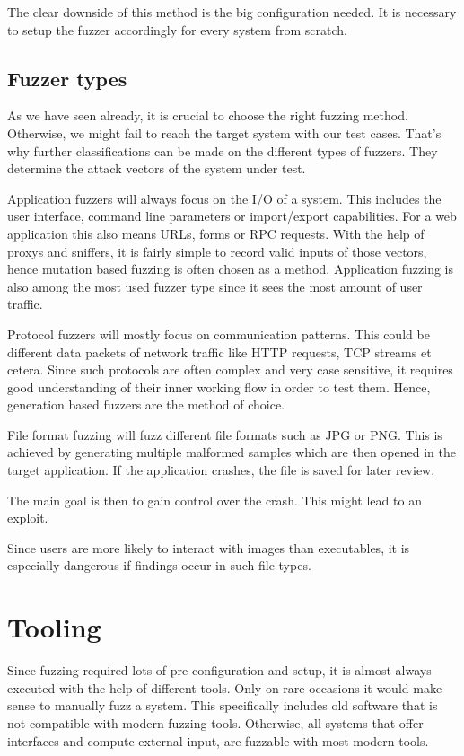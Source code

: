 \documentclass[journal=tosc,final]{iacrtrans}
\begin{document}
   The clear downside of this method is the big configuration needed. It is necessary to setup the fuzzer accordingly for every system from scratch. 
\subsection{Fuzzer types}
As we have seen already, it is crucial to choose the right fuzzing method. Otherwise, we might fail to reach the target system with our test cases. That's  why further classifications can be made on the different types of fuzzers. They determine the attack vectors of the system under test. 

Application fuzzers will always focus on the I/O of a system. This includes the user interface, command line parameters or import/export capabilities. For a web application this also means URLs, forms or RPC requests. With the help of proxys and sniffers, it is fairly simple to record valid inputs of those vectors, hence mutation based fuzzing is often chosen as a method. Application fuzzing  is also among the most used fuzzer type since it sees the most amount of user traffic.

Protocol fuzzers will mostly focus on communication patterns. This could be different data packets of network traffic like HTTP requests, TCP streams et cetera. Since such protocols are often complex and very case sensitive, it requires good understanding of their inner working flow in order to test them. Hence, generation based fuzzers are the method of choice.

File format fuzzing will fuzz different file formats such as JPG or PNG. This is achieved by generating multiple malformed samples which are then opened in the target application. 
If the application crashes, the file is saved for later review. 

The main goal is then to gain control over the crash. This might lead to an exploit.

Since users are more likely to interact with images than executables, it is especially dangerous if findings occur in such file types.
\section{Tooling}
Since fuzzing required lots of pre configuration and setup, it is almost always executed with the help of different tools. Only on rare occasions it would make sense to manually fuzz a system. This specifically includes old software that is not compatible with modern fuzzing tools. Otherwise, all systems that offer interfaces and compute external input, are fuzzable with most modern tools. 
\end{document}
